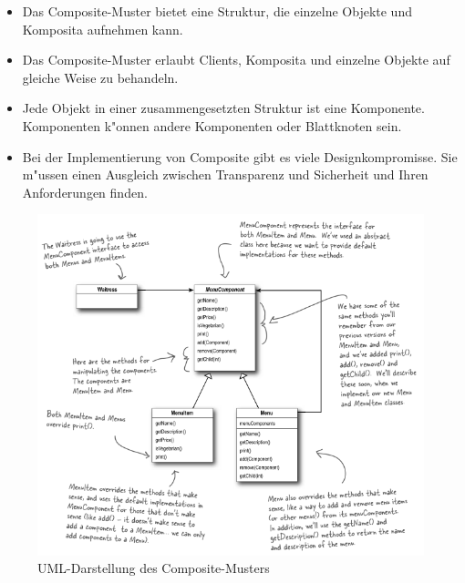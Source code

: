 \begin{itemize}[leftmargin=0.2in]
	\item Das Composite-Muster bietet eine Struktur, die einzelne Objekte und Komposita aufnehmen kann.
	\item Das Composite-Muster erlaubt Clients, Komposita und einzelne Objekte auf gleiche Weise zu behandeln. 
	\item Jede Objekt in einer zusammengesetzten Struktur ist eine Komponente. Komponenten k"onnen andere Komponenten oder Blattknoten sein. 
	\item Bei der Implementierung von Composite gibt es viele Designkompromisse. Sie m"ussen einen Ausgleich zwischen Transparenz und Sicherheit und Ihren Anforderungen finden.
\end{itemize}


\begin{figure}
	\centering
	\includegraphics[width=.9\linewidth]{composite/img/compositeUML}
	\caption{UML-Darstellung des Composite-Musters}
	\label{fig:compositeUML}
\end{figure}
